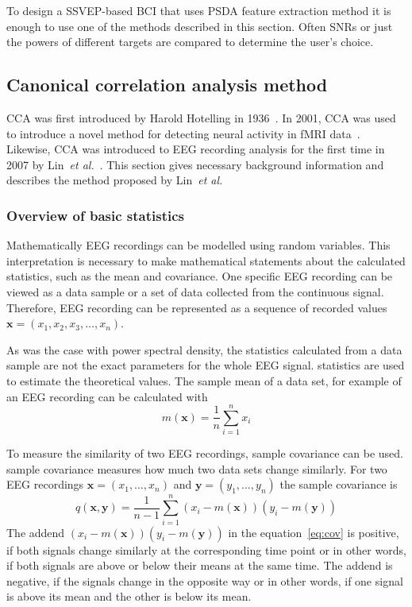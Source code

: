 To design a \gls{SSVEP}-based \gls{BCI} that uses \gls{PSDA} \gls{feature extraction} method it is enough to use one of the methods described in this section. Often \glspl{SNR} or just the powers of different \glspl{target} are compared to determine the user's choice.

\subsection{Canonical correlation analysis method}

\Gls{CCA} was first introduced by Harold Hotelling in 1936~\cite{cca_hotelling}. In 2001, \gls{CCA} was used to introduce a novel method for detecting neural activity in \gls{fMRI} data~\cite{cca_fmri}. Likewise, \gls{CCA} was introduced to \gls{EEG} recording analysis for the first time in 2007 by Lin~\textit{et al.}~\cite{cca_lin}. This section gives necessary background information and describes the method proposed by Lin~\textit{et al.}

\subsubsection{Overview of basic statistics}

Mathematically \gls{EEG} recordings can be modelled using random variables. This interpretation is necessary to make mathematical statements about the calculated \glspl{statistic}, such as the \gls{mean} and \gls{covariance}. One specific \gls{EEG} recording can be viewed as a data \gls{sample} or a set of data collected from the continuous signal. Therefore, \gls{EEG} recording can be represented as a sequence of recorded values $\mathbf{x}=(x_1, x_2, x_3, \dots, x_n)$. 

As was the case with \gls{power spectral density}, the \glspl{statistic} calculated from a data \gls{sample} are not the exact parameters for the whole \gls{EEG} signal. \Glspl{statistic} are used to estimate the theoretical values. The \gls{sample} \gls{mean} of a data set, for example of an \gls{EEG} recording can be calculated with
\begin{equation}
	m(\mathbf{x}) = \frac{1}{n}\sum_{i=1}^{n}x_i
\end{equation}

To measure the similarity of two \gls{EEG} recordings, \gls{sample} \gls{covariance} can be used. \Gls{sample} \gls{covariance} measures how much two data sets change similarly. For two \gls{EEG} recordings $\mathbf{x}=(x_1,\dots,x_n)$ and $\mathbf{y}=(y_1, \dots, y_n)$ the \gls{sample} \gls{covariance} is
\begin{equation}
	\label{eq:cov}
	q(\mathbf{x},\mathbf{y}) = \frac{1}{n-1}\sum_{i=1}^{n}(x_i-m(\mathbf{x}))(y_i-m(\mathbf{y}))
\end{equation}
The addend $(x_i-m(\mathbf{x}))(y_i-m(\mathbf{y}))$ in the equation~\ref{eq:cov} is positive, if both signals change similarly at the corresponding time point or in other words, if both signals are above or below their \glspl{mean} at the same time. The addend is negative, if the signals change in the opposite way or in other words, if one signal is above its \gls{mean} and the other is below its \gls{mean}.


